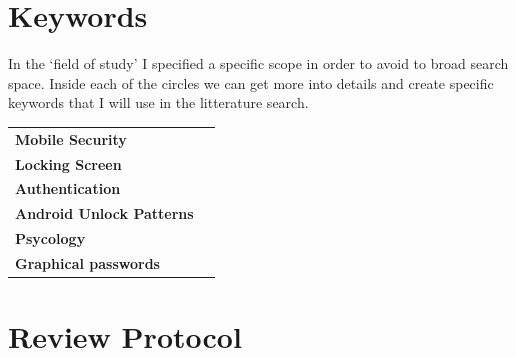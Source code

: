     \section*{Keywords}  
    In the `field of study' I specified a specific scope in order to avoid to broad search space. 
    Inside each of the circles we can get more into details and create specific keywords that I will use in 
     the litterature search. 

    \begin{tabular}{ || l | l ||}
      \hline
      {\bf Mobile Security} & \\
      {\bf Locking Screen} &  \\
      {\bf Authentication} &  \\
      {\bf Android Unlock Patterns} & \\ 
      {\bf Psycology} & \\
      {\bf Graphical passwords} & \\
      \hline
    \end{tabular}
    \section*{Review Protocol}
